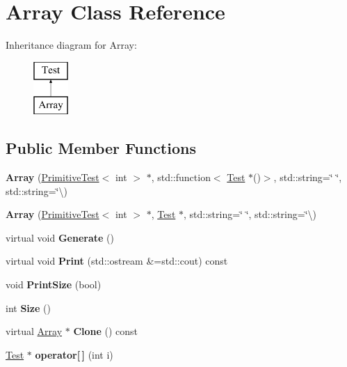 \hypertarget{class_array}{}\section{Array Class Reference}
\label{class_array}
Inheritance diagram for Array\+:\begin{figure}[H]
\begin{center}
\leavevmode
\includegraphics[height=2.000000cm]{class_array}
\end{center}
\end{figure}
\subsection*{Public Member Functions}
\begin{DoxyCompactItemize}
\item 
\mbox{\label{class_array_aae39c85f40010b4a6697283edb6e09e6}} 
{\bfseries Array} (\hyperlink{class_primitive_test}{Primitive\+Test}$<$ int $>$ $\ast$, std\+::function$<$ \hyperlink{class_test}{Test} $\ast$()$>$, std\+::string=\char`\"{} \char`\"{}, std\+::string=\char`\"{}\textbackslash{})
\item 
\mbox{\label{class_array_a8afd0c475486567863069e3b20407de3}} 
{\bfseries Array} (\hyperlink{class_primitive_test}{Primitive\+Test}$<$ int $>$ $\ast$, \hyperlink{class_test}{Test} $\ast$, std\+::string=\char`\"{} \char`\"{}, std\+::string=\char`\"{}\textbackslash{})
\item 
\mbox{\label{class_array_a8150dd2f8052651b58620712dab6b01d}} 
virtual void {\bfseries Generate} ()
\item 
\mbox{\label{class_array_acd4f6a61bdf078fb95d88bfefde968b6}} 
virtual void {\bfseries Print} (std\+::ostream \&=std\+::cout) const
\item 
\mbox{\label{class_array_a00692e10c08fa00422f3c69dffaf493a}} 
void {\bfseries Print\+Size} (bool)
\item 
\mbox{\label{class_array_acd818a5c07a32f35f084e93db7459643}} 
int {\bfseries Size} ()
\item 
\mbox{\label{class_array_abc56765b098f851fbb87bf2210afb9db}} 
virtual \hyperlink{class_array}{Array} $\ast$ {\bfseries Clone} () const
\item 
\mbox{\label{class_array_a52b6dbc5f68eea1434d70c66b7596a80}} 
\hyperlink{class_test}{Test} $\ast$ {\bfseries operator\mbox{[}$\,$\mbox{]}} (int i)
\end{DoxyCompactItemize}
